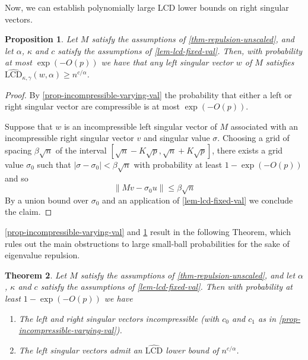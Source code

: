 \documentclass[11pt]{article}
\numberwithin{equation}{section}
\newtheorem{theorem}{Theorem}[section]
\newtheorem{proposition}[theorem]{Proposition}
\theoremstyle{remark}
\newcommand{\rLCD}{\widehat{\mathrm{LCD}}}
\begin{document}
Now, we can establish polynomially large LCD lower bounds on right singular vectors.

\begin{proposition}\label{prop-lcd-varying-val}
    Let $M$ satisfy the assumptions of \cref{thm-repulsion-unscaled}, and let $\alpha$, $\kappa$ and $c$ satisfy the assumptions of \cref{lem-lcd-fixed-val}. Then, with probability at most $\exp(-O(p))$ we have that any left singular vector $w$ of $M$ satisfies $\rLCD_{\kappa, \gamma}(w, \alpha) \geq n^{c/\alpha}$.
\end{proposition}
\begin{proof}
    By \cref{prop-incompressible-varying-val} the probability that either a left or right singular vector are compressible is at most $\exp(-O(p))$.
    
    Suppose that $w$ is an incompressible left singular vector of $M$ associated with an incompressible right singular vector $v$ and singular value $\sigma$. Choosing a grid of spacing $\beta \sqrt{n}$ of the interval $[\sqrt{n} - K\sqrt{p}, \sqrt{n} + K\sqrt{p}]$, there exists a grid value $\sigma_0$ such that $|\sigma - \sigma_0| < \beta \sqrt{n}$ with probability at least $1 - \exp(-O(p))$ and so 
    \begin{equation*}
        \|M v - \sigma_0 u\| \leq \beta \sqrt{n}
    \end{equation*}
    By a union bound over $\sigma_0$ and an application of \cref{lem-lcd-fixed-val} we conclude the claim.
\end{proof}

\cref{prop-incompressible-varying-val} and \cref{prop-lcd-varying-val} result in the following Theorem, which rules out the main obstructions to large small-ball probabilities for the sake of eigenvalue repulsion.

\begin{theorem}\label{thm-obstructions}
     Let $M$ satisfy the assumptions of \cref{thm-repulsion-unscaled}, and let $\alpha$, $\kappa$ and $c$ satisfy the assumptions of \cref{lem-lcd-fixed-val}. Then with probability at least $1 - \exp(-O(p))$ we have
     \begin{enumerate}
         \item The left and right singular vectors incompressible (with $c_0$ and $c_1$ as in \cref{prop-incompressible-varying-val}).
         \item The left singular vectors admit an $\rLCD$ lower bound of $n^{c/\alpha}$.
     \end{enumerate}
\end{theorem}
\end{document}
